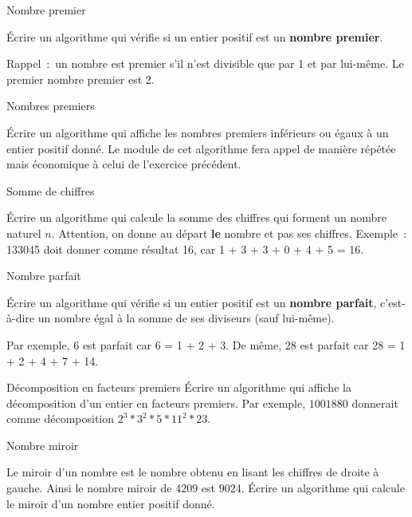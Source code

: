 	\begin{Exercice}{Nombre premier}

		Écrire un algorithme qui vérifie si un entier positif est un
		\textbf{nombre premier}. 

		Rappel~:~un nombre est premier s’il n’est divisible que par 1 et par
		lui-même. Le premier nombre premier est 2.
	\end{Exercice}

	\begin{Exercice}{Nombres premiers}

		Écrire un algorithme qui affiche les nombres premiers inférieurs ou
		égaux à un entier positif donné. Le module de cet algorithme fera appel
		de manière répétée mais économique à celui de l’exercice précédent.
	\end{Exercice}

	\begin{Exercice}{Somme de chiffres}

		Écrire un algorithme qui calcule la somme des chiffres qui forment un
		nombre naturel $n$. Attention, on donne au départ \textbf{le} nombre et
		pas ses chiffres. Exemple~: 133045 doit donner comme résultat 16,
		car 1 + 3 + 3 + 0 + 4 + 5 = 16.
	\end{Exercice}

	\begin{Exercice}{Nombre parfait}

		Écrire un algorithme qui vérifie si un entier positif est un
		\textbf{nombre parfait}, c’est-à-dire un nombre égal à la somme de ses
		diviseurs (sauf lui-même). 

		Par exemple, 6 est parfait car 6 = 1 + 2 + 3. 
		De même, 28 est parfait car 28 = 1 + 2 + 4 + 7 + 14.
	\end{Exercice}

	\begin{Exercice}{Décomposition en facteurs premiers}
		Écrire un algorithme qui affiche la décomposition 
		d’un entier en facteurs premiers. 
		Par exemple, $1001880$ donnerait comme décomposition
		$2^3 * 3^2 * 5 * 11^2 * 23$.
	\end{Exercice}

	\begin{Exercice}{Nombre miroir}

		Le miroir d’un nombre est le nombre obtenu
		en lisant les chiffres de droite à gauche.
		Ainsi le nombre miroir de $4209$ est $9024$.
		Écrire un algorithme qui calcule le miroir
		d’un nombre entier positif donné.
	\end{Exercice}

